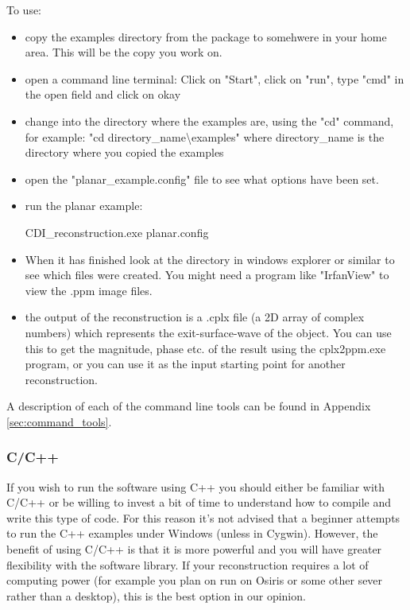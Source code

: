 \documentclass[]{nadia}
\begin{document}
To use:
\begin{itemize}
\item copy the examples directory from the package to somehwere in
  your home area. This will be the copy you work on.
\item open a command line terminal: Click on "Start", click on "run",
  type "cmd" in the open field and click on okay
\item change into the directory where the examples are, using the "cd"
  command, for example: "cd directory\_name\textbackslash examples" where
  directory\_name is the directory where you copied the examples
\item open the "planar\_example.config" file to see what options have
  been set.
\item run the planar example: 
  \begin{myverbatim}
    CDI_reconstruction.exe planar.config
  \end{myverbatim}
\item When it has finished look at the directory in windows explorer
  or similar to see which files were created. You might need a program
  like "IrfanView" to view the .ppm image files.
\item the output of the reconstruction is a .cplx file (a 2D array of
  complex numbers) which represents the exit-surface-wave of the
  object. You can use this to get the magnitude, phase etc. of the
  result using the cplx2ppm.exe program, or you can use it as the
  input starting point for another reconstruction.
\end{itemize}

A description of each of the command line tools can be found 
in Appendix \ref{sec:command_tools}.

\subsubsection{C/C++}

If you wish to run the software using C++ you should either be
familiar with C/C++ or be willing to invest a bit of time to
understand how to compile and write this type of code. For this reason
it's not advised that a beginner attempts to run the C++ examples
under Windows (unless in Cygwin). However, the benefit of using C/C++
is that it is more powerful and you will have greater flexibility with
the software library.  If your reconstruction requires a lot of
computing power (for example you plan on run on Osiris or some other sever rather than a desktop), this is the best option in our opinion.
\end{document}
